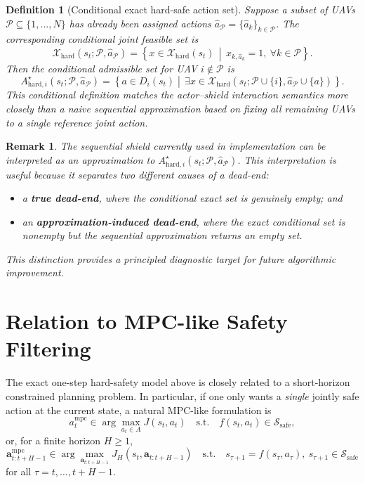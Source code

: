 \documentclass[11pt]{article}
\newtheorem{definition}{Definition}
\newtheorem{remark}{Remark}
\begin{document}
\begin{definition}[Conditional exact hard-safe action set]
Suppose a subset of UAVs $\mathcal P \subseteq \{1,\dots,N\}$ has already been assigned actions $\hat a_{\mathcal P} = \{\hat a_k\}_{k \in \mathcal P}$. The corresponding conditional joint feasible set is
\begin{equation}
\mathcal X_{\mathrm{hard}}(s_t;\mathcal P,\hat a_{\mathcal P})
=
\left\{
x \in \mathcal X_{\mathrm{hard}}(s_t)
\,\middle|\,
x_{k,\hat a_k}=1,\ \forall k \in \mathcal P
\right\}.
\end{equation}
Then the conditional admissible set for UAV $i \notin \mathcal P$ is
\begin{equation}
A^{\star}_{\mathrm{hard},i}(s_t;\mathcal P,\hat a_{\mathcal P})
=
\left\{
a \in D_i(s_t)
\middle|\,
\exists x \in \mathcal X_{\mathrm{hard}}(s_t;\mathcal P \cup \{i\},\hat a_{\mathcal P} \cup \{a\})
\right\}.
\end{equation}
This conditional definition matches the actor--shield interaction semantics more closely than a naive sequential approximation based on fixing all remaining UAVs to a single reference joint action.
\end{definition}

\begin{remark}
The sequential shield currently used in implementation can be interpreted as an approximation to $A^{\star}_{\mathrm{hard},i}(s_t;\mathcal P,\hat a_{\mathcal P})$. This interpretation is useful because it separates two different causes of a dead-end:
\begin{itemize}[leftmargin=1.5em]
    \item a \textbf{true dead-end}, where the conditional exact set is genuinely empty; and
    \item an \textbf{approximation-induced dead-end}, where the exact conditional set is nonempty but the sequential approximation returns an empty set.
\end{itemize}
This distinction provides a principled diagnostic target for future algorithmic improvement.
\end{remark}

\section{Relation to MPC-like Safety Filtering}

The exact one-step hard-safety model above is closely related to a short-horizon constrained planning problem. In particular, if one only wants a \emph{single} jointly safe action at the current state, a natural MPC-like formulation is
\begin{equation}
a_t^{\mathrm{mpc}}
\in
\arg\max_{a_t \in A}
J(s_t,a_t)
\quad
\text{s.t.}
\quad
f(s_t,a_t)\in \mathcal S_{\mathrm{safe}},
\end{equation}
or, for a finite horizon $H \ge 1$,
\begin{equation}
\mathbf a_{t:t+H-1}^{\mathrm{mpc}}
\in
\arg\max_{\mathbf a_{t:t+H-1}}
J_H(s_t,\mathbf a_{t:t+H-1})
\quad
\text{s.t.}
\quad
s_{\tau+1}=f(s_\tau,a_\tau),\ 
s_{\tau+1}\in \mathcal S_{\mathrm{safe}}
\end{equation}
for all $\tau=t,\dots,t+H-1$.
\end{document}
